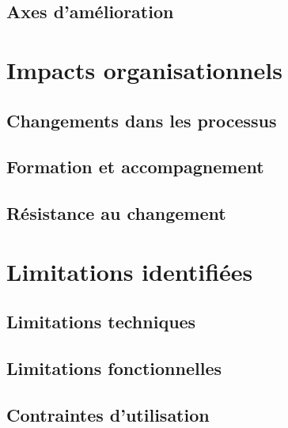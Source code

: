 
\subsection{Axes d'amélioration}


\section{Impacts organisationnels}


\subsection{Changements dans les processus}


\subsection{Formation et accompagnement}


\subsection{Résistance au changement}


\section{Limitations identifiées}


\subsection{Limitations techniques}


\subsection{Limitations fonctionnelles}


\subsection{Contraintes d'utilisation}

